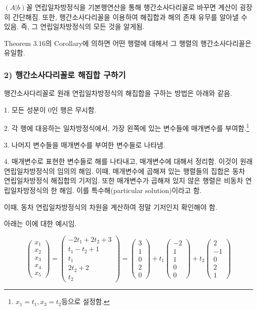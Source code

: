 $(A|b)$꼴 연립일차방정식을 기본행연산을 통해 행간소사다리꼴로 바꾸면 계산이 굉장히 간단해짐. 또한, 행간소사다리꼴을 이용하여 해집합과 해의 존재 유무를 알아낼 수 있음. 즉, 그 연립일차방정식의 모든 것을 알게됨.

Theorem 3.16의 Corollary에 의하면 어떤 행렬에 대해서 그 행렬의 행간소사다리꼴은 유일함.


\newpage


\subsubsection*{2) 행간소사다리꼴로 해집합 구하기}
행간소사다리꼴로 원래 연립일차방정식의 해집합을 구하는 방법은 아래와 같음.

1. 모든 성분이 0인 행은 무시함.

2. 각 행에 대응하는 일차방정식에서, 가장 왼쪽에 있는 변수들에 매개변수를 부여함.\footnote{$x_1=t_1, x_3=t_2$등으로 설정함.}

3. 나머지 변수들을 매개변수를 부여한 변수들로 나타냄.

4. 매개변수로 표현한 변수들로 해를 나타내고, 매개변수에 대해서 정리함. 이것이 원래 연립일차방정식의 임의의 해임. 이때, 매개변수에 곱해져 있는 행렬들의 집합은 동차 연립일차방정식 해집합의 기저임. 또한 매개변수가 곱해져 있지 않은 행렬은 비동차 연립일차방정식의 한 해임. 이를 특수해(particular solution)이라고 함.

이때, 동차 연립일차방정식의 차원을 계산하여 정말 기저인지 확인해야 함.

아래는 이에 대한 예시임.

\[
\begin{pmatrix}
x_1\\
x_2\\
x_3\\
x_4\\
x_5
\end{pmatrix}
=
\begin{pmatrix}
-2t_1+2t_2+3\\
t_1-t_2+1\\
t_1\\
2t_2+2\\
t_2
\end{pmatrix}
=
\begin{pmatrix}
3\\
1\\
0\\
2\\
0
\end{pmatrix}
+t_1
\begin{pmatrix}
-2\\
1\\
1\\
0\\
0
\end{pmatrix}
+t_2
\begin{pmatrix}
2\\
-1\\
0\\
2\\
1
\end{pmatrix}
\]

